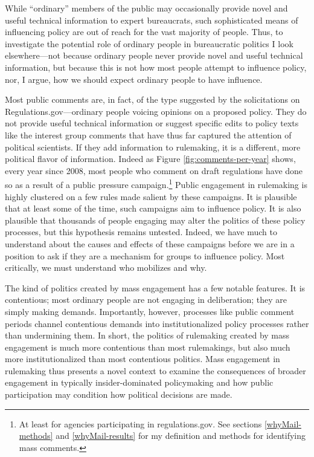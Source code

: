 \documentclass[
      12pt,
        ]{article}
\begin{document}
While ``ordinary'' members of the public may occasionally provide novel
and useful technical information to expert bureaucrats, such
sophisticated means of influencing policy are out of reach for the vast
majority of people. Thus, to investigate the potential role of ordinary
people in bureaucratic politics I look elsewhere---not because ordinary
people never provide novel and useful technical information, but because
this is not how most people attempt to influence policy, nor, I argue,
how we should expect ordinary people to have influence.

Most public comments are, in fact, of the type suggested by the
solicitations on Regulations.gov---ordinary people voicing opinions on a proposed policy. They do not provide useful technical information or
suggest specific edits to policy texts like the interest group comments
that have thus far captured the attention of political scientists. If
they add information to rulemaking, it is a different, more political
flavor of information. Indeed as Figure
\ref{fig:comments-per-year} shows, every year since 2008, most people who
comment on draft regulations have done so as a result of a public pressure campaign.\footnote{At least for agencies participating in regulations.gov. See
  sections
  \ref{whyMail-methods} and
  \ref{whyMail-results} for my definition and methods for identifying mass comments.} Public engagement in rulemaking is highly
clustered on a few rules made salient by these campaigns. It is
plausible that at least some of the time, such campaigns aim to
influence policy. It is also plausible that thousands of people engaging
may alter the politics of these policy processes, but this hypothesis
remains untested. Indeed, we have much to understand about the causes
and effects of these campaigns before we are in a position to ask if
they are a mechanism for groups to influence policy. Most critically, we
must understand who mobilizes and why.

The kind of politics created by mass engagement has a few notable
features. It is contentious; most ordinary people are not engaging in
deliberation; they are simply making demands. Importantly, however,
processes like public comment periods channel contentious demands into
institutionalized policy processes rather than undermining them. In
short, the politics of rulemaking created by mass engagement is much
more contentious than most rulemakings, but also much more
institutionalized than most contentious politics. Mass engagement in
rulemaking thus presents a novel context to examine the consequences of
broader engagement in typically insider-dominated policymaking and how
public participation may condition how political decisions are made.
\end{document}
